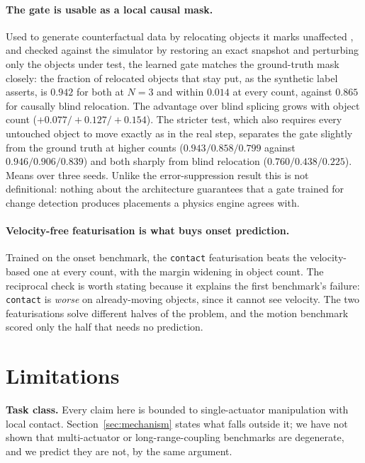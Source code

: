 \documentclass{article}
\begin{document}
\paragraph{The gate is usable as a local causal mask.} Used to generate counterfactual data by
relocating objects it marks unaffected \citep{pitis2020coda}, and checked against the simulator
by restoring an exact snapshot and perturbing only the objects under test, the learned gate
matches the ground-truth mask closely: the fraction of relocated objects that stay put, as the
synthetic label asserts, is $0.942$ for both at $N=3$ and within $0.014$ at every count, against
$0.865$ for causally blind relocation. The advantage over blind splicing grows with object
count ($+0.077 / +0.127 / +0.154$). The stricter test, which also requires every untouched object
to move exactly as in the real step, separates the gate slightly from the ground truth at higher
counts ($0.943 / 0.858 / 0.799$ against $0.946 / 0.906 / 0.839$) and both sharply from blind
relocation ($0.760 / 0.438 / 0.225$). Means over three seeds. Unlike the
error-suppression result this is not definitional: nothing about the architecture guarantees
that a gate trained for change detection produces placements a physics engine agrees with.

\paragraph{Velocity-free featurisation is what buys onset prediction.} Trained on the onset
benchmark, the \texttt{contact} featurisation beats the velocity-based one at every count, with
the margin widening in object count. The reciprocal check is worth stating because it explains
the first benchmark's failure: \texttt{contact} is \emph{worse} on already-moving objects, since
it cannot see velocity. The two featurisations solve different halves of the problem, and the
motion benchmark scored only the half that needs no prediction.

\section{Limitations}
\label{sec:limitations}

\textbf{Task class.} Every claim here is bounded to single-actuator manipulation with local
contact. Section~\ref{sec:mechanism} states what falls outside it; we have not shown that
multi-actuator or long-range-coupling benchmarks are degenerate, and we predict they are not,
by the same argument.
\end{document}

